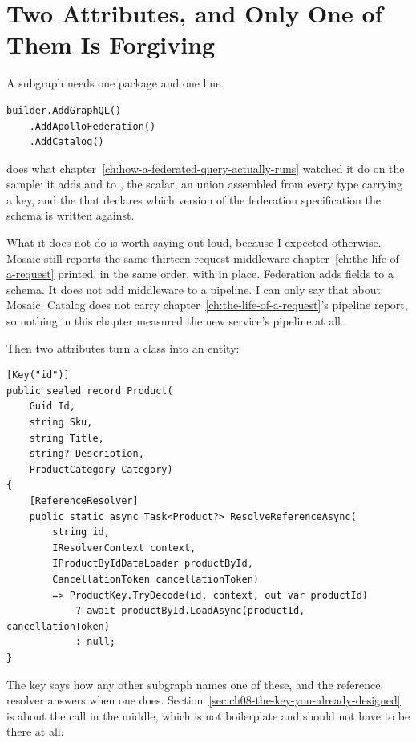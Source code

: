 \section{Two Attributes, and Only One of Them Is Forgiving}
\label{sec:ch08-two-attributes}
%

A subgraph needs one package and one line.

\begin{verbatim}
builder.AddGraphQL()
    .AddApolloFederation()
    .AddCatalog()
\end{verbatim}

 does what
chapter~\ref{ch:how-a-federated-query-actually-runs} watched it do on the
sample: it adds  and  to , the
 scalar, an  union assembled from every type carrying
a key, and the  that declares which version of the federation
specification the schema is written against.

What it does not do is worth saying out loud, because I expected otherwise.
Mosaic still reports the same thirteen request middleware
chapter~\ref{ch:the-life-of-a-request} printed, in the same order, with
 in place. Federation adds fields to a schema. It
does not add middleware to a pipeline. I can only say that about Mosaic:
Catalog does not carry chapter~\ref{ch:the-life-of-a-request}'s pipeline
report, so nothing in this chapter measured the new service's pipeline at all.

Then two attributes turn a class into an entity:

\begin{verbatim}
[Key("id")]
public sealed record Product(
    Guid Id,
    string Sku,
    string Title,
    string? Description,
    ProductCategory Category)
{
    [ReferenceResolver]
    public static async Task<Product?> ResolveReferenceAsync(
        string id,
        IResolverContext context,
        IProductByIdDataLoader productById,
        CancellationToken cancellationToken)
        => ProductKey.TryDecode(id, context, out var productId)
            ? await productById.LoadAsync(productId, cancellationToken)
            : null;
}
\end{verbatim}

The key says how any other subgraph names one of these, and the reference
resolver answers when one does.
Section~\ref{sec:ch08-the-key-you-already-designed} is about the
 call in the middle, which is not boilerplate and should not
have to be there at all.

